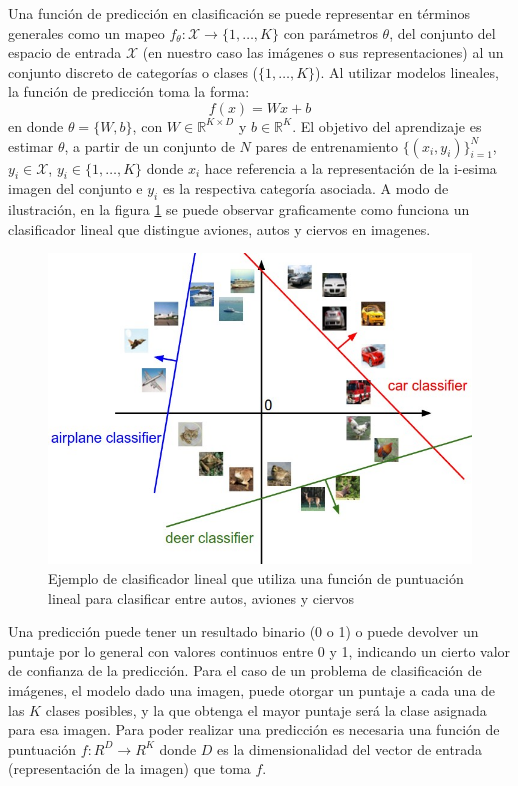 \documentclass[a4paper,11pt,spanish]{book}
\begin{document}
	  Una función de predicción en clasificación se puede representar en términos generales como un mapeo $f_{\theta}: \mathcal{X}
          {\rightarrow} \{1,\dots,K\}$ con parámetros $\theta$, del conjunto del espacio de entrada $\mathcal{X}$ (en nuestro caso las imágenes o sus
          representaciones) al un conjunto discreto de categorías o clases ($\{1,\dots,K\}$). Al utilizar modelos lineales, la función de predicción toma la forma:
          \begin{equation} \label{eq:linear_classifier}
            f(x) = W x + b
          \end{equation}
          en donde $\theta=\{W, b\}$, con $W\in\mathbb{R}^{K \times D}$ y $b\in\mathbb{R}^K$.
          El objetivo del aprendizaje es estimar $\theta$, a partir de un conjunto de $N$ pares de entrenamiento $\{(x_i, y_i)\}_{i=1}^N$, $y_i \in \mathcal{X}$, $y_i\in\{1,\dots,K\}$
          donde $x_i$ hace referencia a la representación de la i-esima imagen del conjunto e $y_i$ es la respectiva categoría asociada.
	  A modo de ilustración, en la figura \ref{fig:linear_classifier} se puede observar graficamente como funciona un clasificador lineal que distingue aviones, autos y ciervos en imagenes.
	  \begin{figure}[ht]
	    \begin{center}
	     \includegraphics[width=0.8\linewidth]{./img/stanford_linear_class.jpeg}
	    \end{center}
	    \caption{Ejemplo de clasificador lineal que utiliza una función de puntuación lineal para clasificar entre autos, aviones y ciervos}
	    \label{fig:linear_classifier}
	  \end{figure}

\iffalse	  
	  Una predicción puede tener un resultado binario (0 o 1) o puede devolver un puntaje por lo general con valores continuos entre 0 y 1, indicando un cierto valor de confianza
	  de la predicción. Para el caso de un problema de clasificación de imágenes, el modelo dado una imagen, puede otorgar un puntaje a cada una de las $K$ clases posibles,
	  y la que obtenga el mayor puntaje será la clase asignada para esa imagen. Para poder realizar una predicción es necesaria una función de puntuación $f:R^D {\rightarrow} R^K$
	  donde $D$ es la dimensionalidad del vector de entrada (representación de la imagen) que toma $f$.
\end{document}
